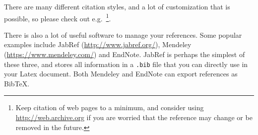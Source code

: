 There are many different citation styles, and a lot of customization that is possible, so please check out e.g.~\cite{BiberBibtexEtc,WikibookLatex}\footnote{Keep citation of web pages to a minimum, and consider using \url{http://web.archive.org} if you are worried that the reference may change or be removed in the future.}.

There is also a lot of useful software to manage your references. Some popular examples include JabRef (\url{http://www.jabref.org/}), Mendeley (\url{https://www.mendeley.com/}) and EndNote. JabRef is perhaps the simplest of these three, and stores all information in a \texttt{.bib} file that you can directly use in your Latex document. Both Mendeley and EndNote can export references as BibTeX.

